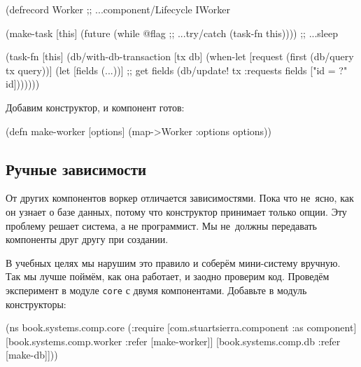 \begin{english}
  \begin{clojure}
(defrecord Worker
  ;; ...component/Lifecycle
  IWorker

  (make-task [this]
    (future
      (while @flag        ;; ...try/catch
        (task-fn this)))) ;; ...sleep

  (task-fn [this]
    (db/with-db-transaction [tx db]
      (when-let [request (first (db/query tx query))]
        (let [fields (...))] ;; get fields
          (db/update! tx :requests
                      fields ["id = ?" id]))))))
  \end{clojure}
\end{english}

\fi

\noindent
Добавим конструктор, и компонент готов:


\begin{english}
  \begin{clojure}
(defn make-worker
  [options]
  (map->Worker {:options options}))
  \end{clojure}
\end{english}

\subsection{Ручные зависимости}


От других компонентов воркер отличается зависимостями. Пока что не~ясно, как он
узнает о базе данных, потому что конструктор принимает только опции. Эту
проблему решает система, а не программист. Мы не~должны передавать компоненты
друг другу при создании.

В учебных целях мы нарушим это правило и соберём мини-систему вручную. Так мы
лучше поймём, как она работает, и заодно проверим код. Проведём эксперимент в
модуле \verb|core| с двумя компонентами. Добавьте в модуль конструкторы:

\ifnarrow

\begin{english}
  \begin{clojure}
(ns book.systems.comp.core
  (:require
   [com.stuartsierra.component
    :as component]
   [book.systems.comp.worker
    :refer [make-worker]]
   [book.systems.comp.db
    :refer [make-db]]))
  \end{clojure}
\end{english}

